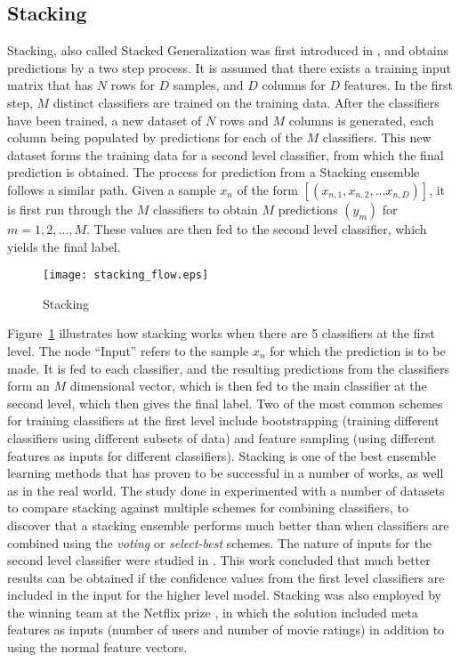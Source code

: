 \subsection{Stacking}
Stacking, also called Stacked Generalization was first introduced in \cite{wolpert1992stacked}, and obtains predictions by a two step process. It is assumed that there exists a training input matrix that has $N$ rows for $D$ samples, and $D$ columns for $D$ features. In the first step, $M$ distinct classifiers are trained on the training data. After the classifiers have been trained, a new dataset of $N$ rows and $M$ columns is generated, each column being populated by predictions for each of the $M$ classifiers. This new dataset forms the training data for a second level classifier, from which the final prediction is obtained. The process for prediction from a Stacking ensemble follows a similar path. Given a sample $x_n$ of the form $[(x_{n, 1}, x_{n, 2}, ... x_{n, D})]$, it is first run through the $M$ classifiers to obtain $M$ predictions $(y_m)$ for $m = 1, 2, ..., M$. These values are then fed to the second level classifier, which yields the final label.\\

\begin{figure}
    \centering
    \texttt{[image: stacking\_flow.eps]}
    \caption{Stacking}
    \label{fig:stacking_flow}
\end{figure}

Figure~\ref{fig:stacking_flow} illustrates how stacking works when there are 5 classifiers at the first level. The node ``Input'' refers to the sample $x_n$ for which the prediction is to be made. It is fed to each classifier, and the resulting predictions from the classifiers form an $M$ dimensional vector, which is then fed to the main classifier at the second level, which then gives the final label. Two of the most common schemes for training classifiers at the first level include bootstrapping (training different classifiers using different subsets of data) and feature sampling (using different features as inputs for different classifiers). Stacking is one of the best ensemble learning methods that has proven to be successful in a number of works, as well as in the real world. The study done in \cite{dvzeroski2004combining} experimented with a number of datasets to compare stacking against multiple schemes for combining classifiers, to discover that a stacking ensemble performs much better than when classifiers are combined using the \emph{voting} or \emph{select-best} schemes. The nature of inputs for the second level classifier were studied in \cite{ting2011issues}. This work concluded that much better results can be obtained if the confidence values from the first level classifiers are included in the input for the higher level model. Stacking was also employed by the winning team at the Netflix prize \cite{koren2009bellkor}, in which the solution included meta features as inputs (number of users and number of movie ratings) in addition to using the normal feature vectors.
